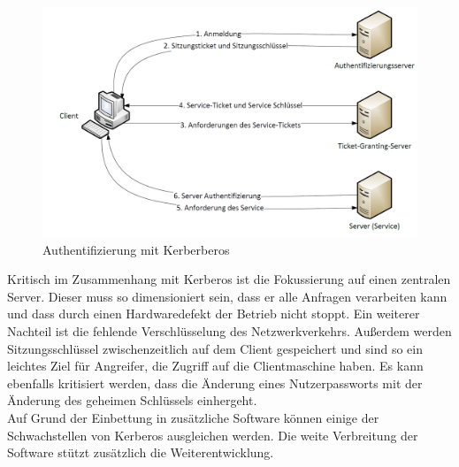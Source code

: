 \documentclass[
book,
a4paper,   
titlepage,  
halfparskip,
12pt        
]{scrartcl}
\begin{document}
\begin{onehalfspacing}
\begin{figure}[h]
	\centering
	\includegraphics[width=1\linewidth]{kerberos.PNG}
	\caption[Kerberos]{Authentifizierung mit Kerberberos \cite[vgl. S.140]{kerberos2}}
	\label{fig:kerb}
\end{figure}

Kritisch im Zusammenhang mit Kerberos ist die Fokussierung auf einen zentralen Server. Dieser muss so dimensioniert sein, dass er alle Anfragen verarbeiten kann und dass durch einen Hardwaredefekt der Betrieb nicht stoppt. Ein weiterer Nachteil ist die fehlende Verschlüsselung des Netzwerkverkehrs. Außerdem werden Sitzungsschlüssel zwischenzeitlich auf dem Client gespeichert und sind so ein leichtes Ziel für Angreifer, die Zugriff auf die Clientmaschine haben. Es kann ebenfalls kritisiert werden, dass die Änderung eines Nutzerpassworts mit der Änderung des geheimen Schlüssels einhergeht.\\
Auf Grund der Einbettung in zusätzliche Software können einige der Schwachstellen von Kerberos ausgleichen werden. Die weite Verbreitung der Software \cite{datalabs} stützt zusätzlich die Weiterentwicklung.\cite[vgl. S.138f]{kerberos2}\cite{kerb3}


\end{onehalfspacing}
\end{document}
